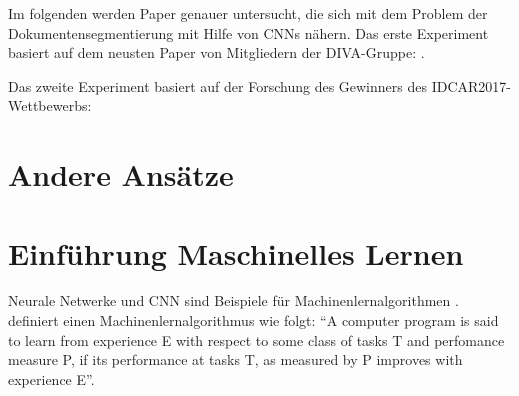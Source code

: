 Im folgenden werden Paper genauer untersucht, die sich mit dem Problem der Dokumentensegmentierung mit Hilfe von CNNs nähern.
Das erste Experiment basiert auf dem neusten Paper von Mitgliedern der DIVA-Gruppe: \citeauthor*{ChenConvolutionalNeuralNetworks2017}. 

Das zweite Experiment basiert auf der Forschung des Gewinners des IDCAR2017-Wettbewerbs: \citeauthor*{XuPageSegmentationHistorical2017} 

\section{Andere Ansätze}
\cite{WickFullyConvolutionalNeural2017}


\section{Einführung Maschinelles Lernen}
Neurale Netwerke und CNN sind Beispiele für Machinenlernalgorithmen .
\cite{MitchellMachinelearning1997} definiert einen Machinenlernalgorithmus wie folgt: ``A computer program is said to learn from experience E with respect to some class of tasks T and perfomance measure P, if its performance at tasks T, as measured by P improves with experience E''.

